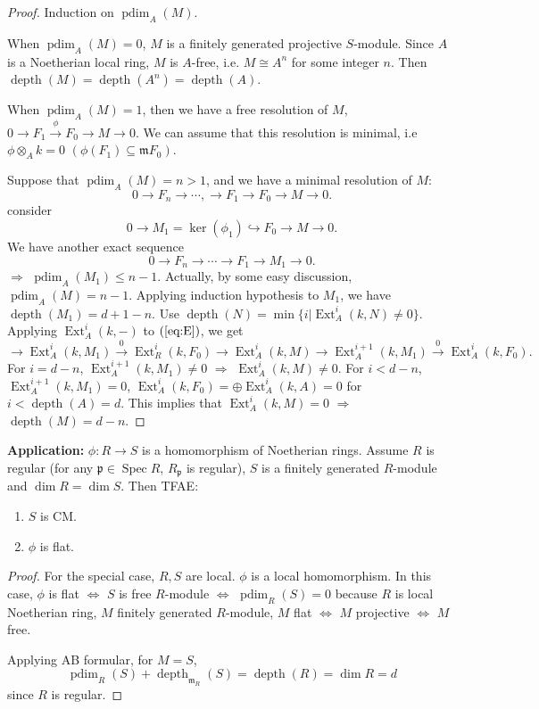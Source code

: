 \documentclass[cs4size]{article}
\newcommand{\su}{\subseteq}
\newcommand{\frm}{\mathfrak{m}}
\newcommand{\frp}{\mathfrak{p}}
\newcommand{\ra}{\rightarrow}
\newcommand{\xr}{\xrightarrow}
\newcommand{\Ra}{\Rightarrow}
\DeclareMathOperator{\Ext}{Ext}
\DeclareMathOperator{\Spec}{Spec}
\DeclareMathOperator{\depth}{depth}
\DeclareMathOperator{\pdim}{pdim}
\begin{document}
\begin{proof}
Induction on $\pdim_A(M)$.

When $\pdim_A(M)=0$, $M$ is a finitely generated projective $S$-module. Since $A$ is a Noetherian local ring, $M$ is $A$-free, i.e. $M\cong A^n$ for some integer $n$. Then $\depth(M)=\depth(A^n)=\depth(A)$.

When $\pdim_A(M)=1$, then we have a free resolution of $M$, $0\ra F_1\xr{\phi}F_0\ra M\ra 0$. We can assume that this resolution is minimal, i.e $\phi\otimes_Ak=0$ $(\phi(F_1)\su\frm F_0)$.

Suppose that $\pdim_A(M)=n>1$, and we have a minimal resolution of $M$: \[0\ra F_n\ra \cdots,\ra F_1\ra F_0\ra M\ra0.\]
consider
\begin{equation}
0\ra M_1=\ker (\phi_1)\hookrightarrow F_0\ra M\ra0.\label{eq:E}
\end{equation}
We have another exact sequence
\[0\ra F_n\ra \cdots\ra F_1\ra M_1\ra 0.\]
$\Ra$ $\pdim_A(M_1)\leq n-1$. Actually, by some easy discussion, $\pdim_A(M)=n-1$.
Applying induction hypothesis to $M_1$, we have $\depth(M_1)=d+1-n$. Use $\depth(N)=\min\{i|\Ext_A^i(k,N)\neq 0\}$. Applying $\Ext_A^i(k,-)$ to $(\ref{eq:E})$, we get
\[\ra \Ext_A^i(k,M_1)\xr{0}\Ext_R^i(k,F_0)\ra \Ext_A^i(k,M)\ra \Ext_A^{i+1}(k,M_1)\xr{0}\Ext_A^i(k,F_0).\]
For $i=d-n$, $\Ext_A^{i+1}(k,M_1)\neq 0$ $\Ra$ $\Ext_A^i(k,M)\neq 0$. For $i<d-n$, $\Ext_A^{i+1}(k,M_1)=0$, $\Ext_A^i(k,F_0)=\oplus \Ext_A^i(k,A)=0$ for $i<\depth(A)=d$. This implies that $\Ext_A^i(k,M)=0$ $\Ra$ $\depth(M)=d-n$.
\end{proof}

\textbf{Application:} $\phi: R\ra S$ is a homomorphism of Noetherian rings. Assume $R$ is regular (for any $\frp\in\Spec R$, $R_\frp$ is regular), $S$ is a finitely generated $R$-module and $\dim R=\dim S$. Then TFAE:
\begin{enumerate}
\item $S$ is CM.
\item $\phi$ is flat.
\end{enumerate}
\begin{proof}
For the special case, $R,S$ are local. $\phi$ is a local homomorphism. In this case, $\phi$ is flat $\Leftrightarrow$ $S$ is free $R$-module $\Leftrightarrow$ $\pdim_R(S)=0$ because $R$ is local Noetherian ring, $M$ finitely generated $R$-module, $M$ flat $\Leftrightarrow$ $M$ projective $\Leftrightarrow$ $M$ free.

Applying AB formular, for $M=S$,
\[\pdim_R(S)+\depth_{\frm_R}(S)=\depth(R)=\dim R=d\] since $R$ is regular.
\end{proof}
\end{document}
